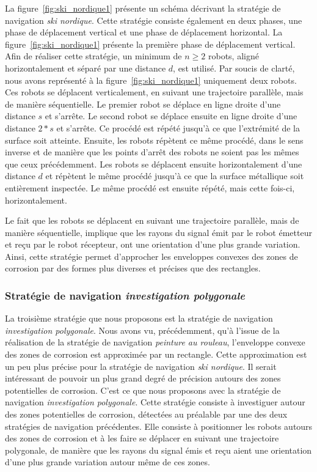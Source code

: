 \documentclass[francais,RandD]{rapportPFE}
\begin{document}
				La figure~\ref{fig:ski_nordique1} présente un schéma décrivant la stratégie de navigation \textit{ski nordique}.
				Cette stratégie consiste également en deux phases, une phase de déplacement vertical et une phase de déplacement horizontal.
				La figure~\ref{fig:ski_nordique1} présente la première phase de déplacement vertical.
				Afin de réaliser cette stratégie, un minimum de $n \ge 2$ robots, aligné horizontalement et séparé par une distance $d$, est utilisé.
				Par soucis de clarté, nous avons représenté à la figure~\ref{fig:ski_nordique1} uniquement deux robots.
				Ces robots se déplacent verticalement, en suivant une trajectoire parallèle, mais de manière séquentielle.
				Le premier robot se déplace en ligne droite d'une distance $s$ et s'arrête.
				Le second robot se déplace ensuite en ligne droite d'une distance $2 * s$ et s'arrête.
				Ce procédé est répété jusqu'à ce que l'extrémité de la surface soit atteinte.
				Ensuite, les robots répètent ce même procédé, dans le sens inverse et de manière que les points d'arrêt des robots ne soient pas les mêmes que ceux précédemment.
				Les robots se déplacent ensuite horizontalement d'une distance $d$ et répètent le même procédé jusqu'à ce que la surface métallique soit entièrement inspectée.
				Le même procédé est ensuite répété, mais cette fois-ci, horizontalement.

				Le fait que les robots se déplacent en suivant une trajectoire parallèle, mais de manière séquentielle, implique que les rayons du signal émit par le robot émetteur et reçu par le robot récepteur, ont une orientation d'une plus grande variation.
				Ainsi, cette stratégie permet d'approcher les enveloppes convexes des zones de corrosion par des formes plus diverses et précises que des rectangles.
			\subsubsection*{Stratégie de navigation \textit{investigation polygonale}}
				La troisième stratégie que nous proposons est la stratégie de navigation \textit{investigation polygonale}.
				Nous avons vu,  précédemment, qu'à l'issue de la réalisation de la stratégie de navigation \textit{peinture au rouleau}, l'enveloppe convexe des zones de corrosion est approximée par un rectangle.
				Cette approximation est un peu plus précise pour la stratégie de navigation \textit{ski nordique}.
				Il serait intéressant de pouvoir un plus grand degré de précision autours des zones potentielles de corrosion.
				C'est ce que nous proposons avec la stratégie de navigation \textit{investigation polygonale}.
				Cette stratégie consiste à investiguer autour des zones potentielles de corrosion, détectées au préalable par une des deux stratégies de navigation précédentes.
				Elle consiste à positionner les robots autours des zones de corrosion et à les faire se déplacer en suivant une trajectoire polygonale, de manière que les rayons du signal émis et reçu aient une orientation d'une plus grande variation autour même de ces zones.
\end{document}
